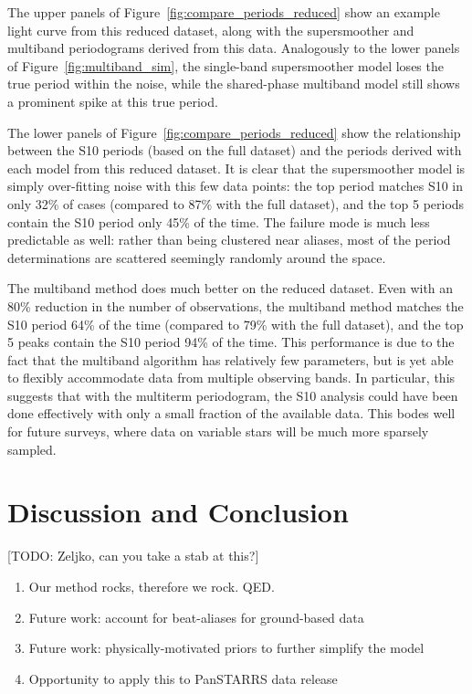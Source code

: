 \documentclass[12pt,preprint]{aastex}
\newcommand{\todo}[1]{{\color{red} [TODO: #1]}}
\newcommand{\Fig}[1]{Figure~\ref{fig:#1}}
\newcommand{\fig}[1]{\Fig{#1}}
\begin{document}
The upper panels of \fig{compare_periods_reduced} show an example light curve from this reduced dataset, along with the supersmoother and multiband periodograms derived from this data. Analogously to the lower panels of \fig{multiband_sim}, the single-band supersmoother model loses the true period within the noise, while the shared-phase multiband model still shows a prominent spike at this true period.

The lower panels of \fig{compare_periods_reduced} show the relationship between the S10 periods (based on the full dataset) and the periods derived with each model from this reduced dataset. It is clear that the supersmoother model is simply over-fitting noise with this few data points: the top period matches S10 in only 32\% of cases (compared to 87\% with the full dataset), and the top 5 periods contain the S10 period only 45\% of the time. The failure mode is much less predictable as well: rather than being clustered near aliases, most of the period determinations are scattered seemingly randomly around the space.

The multiband method does much better on the reduced dataset. Even with an 80\% reduction in the number of observations, the multiband method matches the S10 period 64\% of the time (compared to 79\% with the full dataset), and the top 5 peaks contain the S10 period 94\% of the time. This performance is due to the fact that the multiband algorithm has relatively few parameters, but is yet able to flexibly accommodate data from multiple observing bands. In particular, this suggests that with the multiterm periodogram, the S10 analysis could have been done effectively with only a small fraction of the available data. This bodes well for future surveys, where data on variable stars will be much more sparsely sampled.

\section{Discussion and Conclusion}

\todo{Zeljko, can you take a stab at this?}

\begin{enumerate}
  \item Our method rocks, therefore we rock. QED.
  \item Future work: account for beat-aliases for ground-based data
  \item Future work: physically-motivated priors to further simplify the model
  \item Opportunity to apply this to PanSTARRS data release
\end{enumerate}
\end{document}
